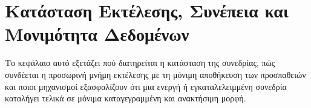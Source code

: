 \chapter{Κατάσταση Εκτέλεσης, Συνέπεια και Μονιμότητα Δεδομένων}
\label{ch:runtime_state_persistence}

Το κεφάλαιο αυτό εξετάζει πού διατηρείται η κατάσταση της συνεδρίας, πώς συνδέεται η προσωρινή μνήμη εκτέλεσης με τη μόνιμη αποθήκευση των προσπαθειών και ποιοι μηχανισμοί εξασφαλίζουν ότι μια ενεργή ή εγκαταλελειμμένη συνεδρία καταλήγει τελικά σε μόνιμα καταγεγραμμένη και ανακτήσιμη μορφή.


